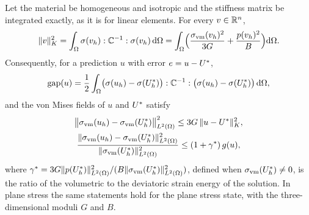 \begin{proposition}\label{prop:stress}
Let the material be homogeneous and isotropic and the stiffness matrix be integrated
exactly, as it is for linear elements. For every $v\in\mathbb{R}^{n}$,
\begin{equation}
\lVert v\rVert_K^{2} = \int_{\Omega}\sigma(v_h):\mathbb{C}^{-1}:\sigma(v_h)\,\mathrm{d}\Omega
= \int_{\Omega}\Bigl(\frac{\sigma_{\mathrm{vm}}(v_h)^{2}}{3G}+\frac{p(v_h)^{2}}{B}\Bigr)\mathrm{d}\Omega .
\label{eq:stressnorm}
\end{equation}
Consequently, for a prediction $u$ with error $e=u-U^{\ast}$,
\begin{equation}
\operatorname{gap}(u) = \frac12\int_{\Omega}\bigl(\sigma(u_h)-\sigma(U^{\ast}_h)\bigr):\mathbb{C}^{-1}:
\bigl(\sigma(u_h)-\sigma(U^{\ast}_h)\bigr)\,\mathrm{d}\Omega ,
\label{eq:gapstress}
\end{equation}
and the von Mises fields of $u$ and $U^{\ast}$ satisfy
\begin{gather}
\bigl\lVert\sigma_{\mathrm{vm}}(u_h)-\sigma_{\mathrm{vm}}(U^{\ast}_h)\bigr\rVert_{L^2(\Omega)}^{2}\le 3G\,\lVert u-U^{\ast}\rVert_K^{2},
\label{eq:vmbound}\\
\frac{\lVert\sigma_{\mathrm{vm}}(u_h)-\sigma_{\mathrm{vm}}(U^{\ast}_h)\rVert_{L^2(\Omega)}^{2}}{\lVert\sigma_{\mathrm{vm}}(U^{\ast}_h)\rVert_{L^2(\Omega)}^{2}}
\le (1+\gamma^{\ast})\,g(u),
\label{eq:vmboundrel}
\end{gather}
where $\gamma^{\ast}=3G\lVert p(U^{\ast}_h)\rVert_{L^2(\Omega)}^2/
(B\lVert\sigma_{\mathrm{vm}}(U^{\ast}_h)\rVert_{L^2(\Omega)}^2)$, defined when $\sigma_{\mathrm{vm}}(U^{\ast}_h)\neq0$, is the
ratio of the volumetric to the deviatoric strain energy of the solution. In plane stress
the same statements hold for the plane stress state, with the three-dimensional moduli $G$
and $B$.
\end{proposition}

